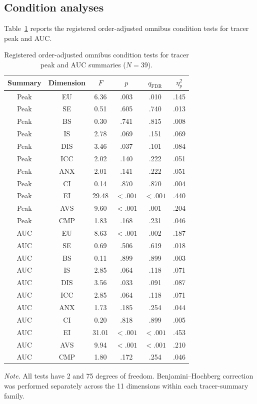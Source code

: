 \documentclass[pdflatex,sn-basic,lineno]{../sn-jnl}
\begin{document}
\subsection{Condition analyses}

Table~\ref{tab:supp_tracer_omnibus} reports the registered order-adjusted omnibus condition tests for tracer peak and AUC.

\begin{table}[!htbp]
\centering
\scriptsize
\setlength{\tabcolsep}{4pt}
\caption{Registered order-adjusted omnibus condition tests for tracer peak and AUC summaries ($N=39$).}
\label{tab:supp_tracer_omnibus}
\begin{tabular*}{\textwidth}{@{\extracolsep{\fill}}cccccc@{}}
\toprule
Summary & Dimension & $F$ & $p$ & $q_{\mathrm{FDR}}$ & $\eta_p^2$ \\
\midrule
Peak & EU  & 6.36  & .003   & .010   & .145 \\
Peak & SE  & 0.51  & .605   & .740   & .013 \\
Peak & BS  & 0.30  & .741   & .815   & .008 \\
Peak & IS  & 2.78  & .069   & .151   & .069 \\
Peak & DIS & 3.46  & .037   & .101   & .084 \\
Peak & ICC & 2.02  & .140   & .222   & .051 \\
Peak & ANX & 2.01  & .141   & .222   & .051 \\
Peak & CI  & 0.14  & .870   & .870   & .004 \\
Peak & EI  & 29.48 & $<.001$ & $<.001$ & .440 \\
Peak & AVS & 9.60  & $<.001$ & .001   & .204 \\
Peak & CMP & 1.83  & .168   & .231   & .046 \\
\midrule
AUC & EU  & 8.63  & $<.001$ & .002   & .187 \\
AUC & SE  & 0.69  & .506   & .619   & .018 \\
AUC & BS  & 0.11  & .899   & .899   & .003 \\
AUC & IS  & 2.85  & .064   & .118   & .071 \\
AUC & DIS & 3.56  & .033   & .091   & .087 \\
AUC & ICC & 2.85  & .064   & .118   & .071 \\
AUC & ANX & 1.73  & .185   & .254   & .044 \\
AUC & CI  & 0.20  & .818   & .899   & .005 \\
AUC & EI  & 31.01 & $<.001$ & $<.001$ & .453 \\
AUC & AVS & 9.94  & $<.001$ & $<.001$ & .210 \\
AUC & CMP & 1.80  & .172   & .254   & .046 \\
\bottomrule
\end{tabular*}
\parbox{\textwidth}{\footnotesize\textit{Note.} All tests have 2 and 75 degrees of freedom. Benjamini--Hochberg correction was performed separately across the 11 dimensions within each tracer-summary family.}
\end{table}
\FloatBarrier
\end{document}
